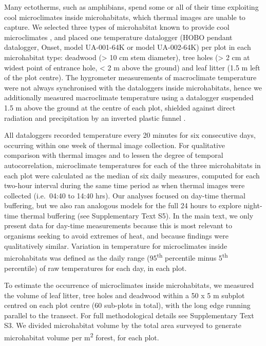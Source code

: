 \documentclass[12pt,a4paper,]{report}
\theoremstyle{definition}
\theoremstyle{definition}
\theoremstyle{definition}
\theoremstyle{remark}
\begin{document}
Many ectotherms, such as amphibians, spend some or all of their time
exploiting cool microclimates inside microhabitats, which thermal images
are unable to capture. We selected three types of microhabitat known to
provide cool microclimates
\citep{scheffers_microhabitats2014, scheffers_microhabitats2014-1, gonzalez_del_pliego_thermally2016},
and placed one temperature datalogger (HOBO pendant datalogger, Onset,
model UA-001-64K or model UA-002-64K) per plot in each microhabitat
type: deadwood (\textgreater{} 10 cm stem diameter), tree holes
(\textgreater{} 2 cm at widest point of entrance hole, \textless{} 2 m
above the ground) and leaf litter (1.5 m left of the plot centre). The
hygrometer measurements of macroclimate temperature were not always
synchronised with the dataloggers inside microhabitats, hence we
additionally measured macroclimate temperature using a datalogger
suspended 1.5 m above the ground at the centre of each plot, shielded
against direct radiation and precipitation by an inverted plastic funnel
\citep{shoo_potential2010, scheffers_microhabitats2014-1}.

All dataloggers recorded temperature every 20 minutes for six
consecutive days, occurring within one week of thermal image collection.
For qualitative comparison with thermal images and to lessen the degree
of temporal autocorrelation, microclimate temperatures for each of the
three microhabitats in each plot were calculated as the median of six
daily measures, computed for each two-hour interval during the same time
period as when thermal images were collected (i.e.~04:40 to 14:40 hrs).
Our analyses focused on day-time thermal buffering, but we also ran
analogous models for the full 24 hours to explore night-time thermal
buffering (see Supplementary Text S5). In the main text, we only present
data for day-time measurements because this is most relevant to
organisms seeking to avoid extremes of heat, and because findings were
qualitatively similar. Variation in temperature for microclimates inside
microhabitats was defined as the daily range (95\textsuperscript{th}
percentile minus 5\textsuperscript{th} percentile) of raw temperatures
for each day, in each plot.

To estimate the occurrence of microclimates inside microhabitats, we
measured the volume of leaf litter, tree holes and deadwood within a 50
x 5 m subplot centred on each plot centre (60 sub-plots in total), with
the long edge running parallel to the transect. For full methodological
details see Supplementary Text S3. We divided microhabitat volume by the
total area surveyed to generate microhabitat volume per
m\textsuperscript{2} forest, for each plot.
\end{document}
